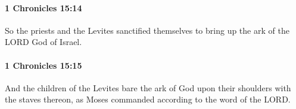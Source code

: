 		\paragraph{1 Chronicles 15:14} %
			\label{1CHRONICLES-15-14}

			So the priests and the Levites sanctified themselves to bring up the ark of the LORD God of Israel.


		\paragraph{1 Chronicles 15:15} %
			\label{1CHRONICLES-15-15}

			And the children of the Levites bare the ark of God upon their shoulders with the staves thereon, as Moses commanded according to the word of the LORD.


